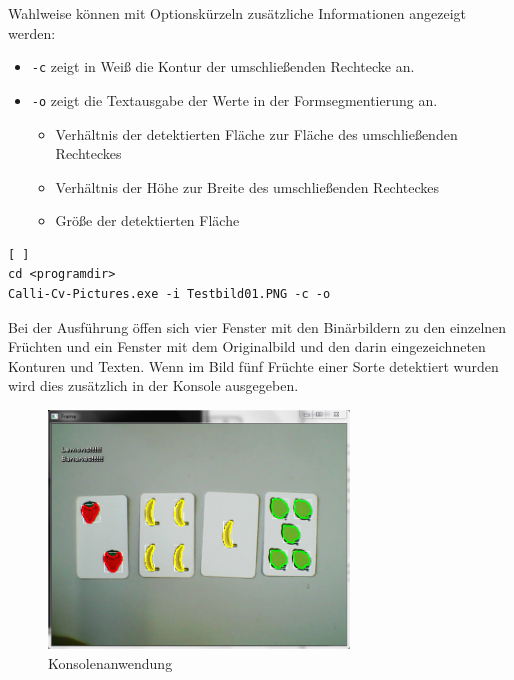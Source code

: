 Wahlweise können mit Optionskürzeln zusätzliche Informationen angezeigt werden:
\begin{itemize}
\item \lstinline{-c} zeigt in Weiß die Kontur der umschließenden Rechtecke an. 
\item \lstinline{-o} zeigt die Textausgabe der Werte in der Formsegmentierung an.
\begin{itemize}
\item Verhältnis der detektierten Fläche zur Fläche des umschließenden Rechteckes
\item Verhältnis der Höhe zur Breite des umschließenden Rechteckes
\item Größe der detektierten Fläche
\end{itemize}
\end{itemize}
\begin{lstlisting}[ ]
cd <programdir>
Calli-Cv-Pictures.exe -i Testbild01.PNG -c -o
\end{lstlisting}
Bei der Ausführung öffen sich vier Fenster mit den Binärbildern zu den einzelnen Früchten und ein Fenster mit dem Originalbild und den darin eingezeichneten Konturen und Texten. Wenn im Bild fünf Früchte einer Sorte detektiert wurden wird dies zusätzlich in der Konsole ausgegeben.
\begin{figure}[H]
    \centering
    \includegraphics[width=8cm]{Abbildungen/Calli-Konsole}
    \caption[Konsole]{Konsolenanwendung}
    \label{fig:Konsole}
\end{figure}
